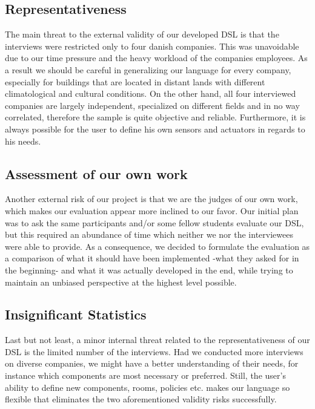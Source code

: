 \subsection{Representativeness}

The main threat to the external validity of our developed DSL is that the interviews were restricted only to four danish companies. This was unavoidable due to our time pressure and the heavy workload of the companies employees. As a result we should be careful in generalizing our language for every company, especially for buildings that are located in distant lands with different climatological and cultural conditions. On the other hand, all four interviewed companies are largely independent, specialized on different fields and in no way correlated, therefore the sample is quite objective and reliable. Furthermore, it is always possible for the user to define his own sensors and actuators in regards to his needs.

\subsection{Assessment of our own work}

Another external risk of our project is that we are the judges of our own work, which makes our evaluation appear more inclined to our favor. Our initial plan was to ask the same participants and/or some fellow students evaluate our DSL, but this required an abundance of time which neither we nor the interviewees were able to provide. As a consequence, we decided to formulate the evaluation as a comparison of what it should have been implemented -what they asked for in the beginning- and what it was actually developed in the end, while trying to maintain an unbiased perspective at the highest level possible.

\subsection{Insignificant Statistics}

Last but not least, a minor internal threat related to the representativeness of our DSL is the limited number of the interviews. Had we conducted more interviews on diverse companies, we might have a better understanding of their needs, for instance which components are most necessary or preferred. Still, the user's ability to define new components, rooms, policies etc. makes our language so flexible that eliminates the two aforementioned validity risks successfully.